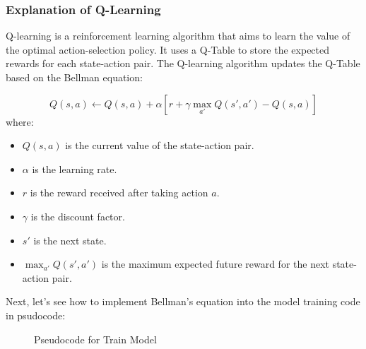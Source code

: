 \documentclass[a4paper,12pt]{report}
\begin{document}
\subsubsection{Explanation of Q-Learning}
Q-learning is a reinforcement learning algorithm that aims to learn the value of the optimal action-selection policy. It uses a Q-Table to store the expected rewards for each state-action pair. The Q-learning algorithm updates the Q-Table based on the Bellman equation:

\begin{equation}
Q(s, a) \leftarrow Q(s, a) + \alpha \left[ r + \gamma \max_{a'} Q(s', a') - Q(s, a) \right]
\end{equation}
where:
\begin{itemize}
    \item $Q(s, a)$ is the current value of the state-action pair.
    \item $\alpha$ is the learning rate.
    \item $r$ is the reward received after taking action $a$.
    \item $\gamma$ is the discount factor.
    \item $s'$ is the next state.
    \item $\max_{a'} Q(s', a')$ is the maximum expected future reward for the next state-action pair.
\end{itemize}


Next, let's see how to implement Bellman's equation into the model training code in psudocode:

\begin{figure}[H]
\caption{Pseudocode for Train Model}
\label{alg:train_model}
\end{figure}
\end{document}
